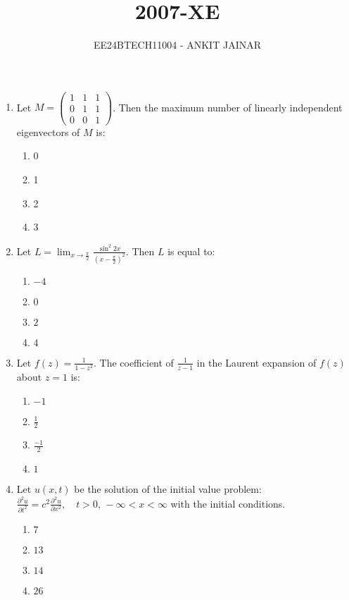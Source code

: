 \documentclass[journal,12pt,onecolumn]{IEEEtran}
\theoremstyle{remark}
\begin{document}

\vspace{3cm}

\title{\textbf{2007-XE}}
\author{EE24BTECH11004 - ANKIT JAINAR}
\maketitle
\bigskip

\renewcommand{\thefigure}{\theenumi}
\renewcommand{\thetable}{\theenumi}
\setlength{\columnsep}{2.5em}

\begin{enumerate}
    \item Let $ M = \begin{pmatrix} 1 & 1 & 1 \\ 0 & 1 & 1 \\ 0 & 0 & 1 \end{pmatrix} $.
    Then the maximum number of linearly independent eigenvectors of $ M $ is:
    \begin{enumerate}
        \item 0
        \item 1
        \item 2
        \item 3
    \end{enumerate}
\item Let $ L = \lim_{x \to \frac{\pi}{2}} \frac{\sin^2 2x}{\left( x - \frac{\pi}{2} \right)^2} $.
    Then $ L $ is equal to:
    \begin{enumerate}
        \item $-4$
        \item $0$
        \item $2$
        \item $4$
    \end{enumerate}
\item Let $ f(z) = \frac{1}{1 - z^2} $.
The coefficient of $ \frac{1}{z - 1} $ in the Laurent expansion of $ f(z) $ about $ z = 1 $ is:
\begin{enumerate}
        \item $-1$
        \item $\frac{1}{2}$
        \item $\frac{-1}{2}$
        \item $1$
    \end{enumerate}
\item Let $ u(x,t) $ be the solution of the initial value problem:
$ \frac{\partial^2 u}{\partial t^2} = c^2 \frac{\partial^2 u}{\partial x^2}, \quad t > 0, \, -\infty < x < \infty $
with the initial conditions.
\begin{enumerate}
        \item $7$
        \item $13$
        \item $14$
        \item $26$
    \end{enumerate}


\end{enumerate}
\end{document}
